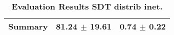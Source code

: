 \begin{table}[htb]
{\begin{tabular}{lll}
\midrule
\textbf{Summary                                  } &                  \phantom{0}81.24 $\pm$ 19.61 &             \phantom{0}0.74 $\pm$ \phantom{0}0.22 \\
\bottomrule
\end{tabular}%
}
\caption{\textbf{Evaluation Results SDT distrib inet.}}
\label{tab:eval-results}
\end{table}
